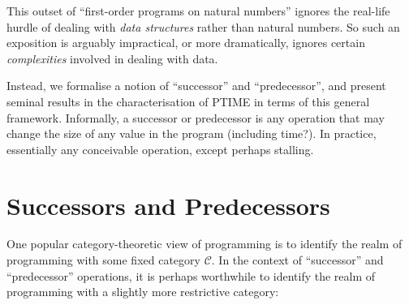 This outset of ``first-order programs on natural numbers'' ignores the
real-life hurdle of dealing with \emph{data structures} rather than natural
numbers. So such an exposition is arguably impractical, or more dramatically,
ignores certain \emph{complexities} involved in dealing with data.

Instead, we formalise a notion of ``successor'' and ``predecessor'', and
present seminal results in the characterisation of PTIME in terms of this
general framework. Informally, a successor or predecessor is any operation that
may change the size of any value in the program (including time?). In practice,
essentially any conceivable operation, except perhaps stalling.

\section{Successors and Predecessors}


One popular category-theoretic view of programming is to identify the realm of
programming with some fixed category $\mathcal{C}$. In the context of
``successor'' and ``predecessor'' operations, it is perhaps worthwhile to
identify the realm of programming with a slightly more restrictive category:

